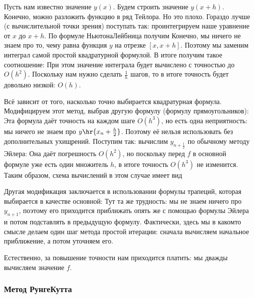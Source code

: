 \documentclass[a4paper]{article}
\newcommand{\dt}{\,dt}
\begin{document}
Пусть нам известно значение $y(x)$. Будем строить значение $y(x+h)$.
Конечно, можно разложить функцию в ряд Тейлора. Но это плохо. Гораздо
лучше (с вычислительной точки зрения) поступать так: проинтегрируем наше уравнение от $x$ до $x+h$.
По формуле Ньютона\ч Лейбница получим
\eqn{y(x+h) = y(x) +\intl{0}{h} f\br{x+t, y(x+t)}\dt.}
Конечно, мы ничего не знаем про то, чему равна функция $y$ на отрезке $[x,x+h]$.
Поэтому мы заменим интеграл самой простой квадратурной формулой.
В итоге получим такое соотношение:
При этом значение интеграла будет вычислено с точностью до $O(h^2)$.
Поскольку нам нужно сделать $\frac{1}{h}$ шагов, то в итоге точность будет довольно низкой: $O(h)$.

Всё зависит от того, насколько точно выбирается квадратурная формула.
Модифицируем этот метод, выбрав другую формулу (формулу прямоугольников):
Эта формула даёт точность на каждом шаге $O(h^3)$, но есть одна неприятность:
мы ничего не знаем про $y\hr{x_n + \frac h2}$. Поэтому её нельзя использовать без дополнительных
ухищрений. Поступим так: вычислим $y_{n+\frac12}$ по обычному методу Эйлера:
Она даёт погрешность $O(h^2)$, но поскольку перед $f$  в основной формуле уже есть один множитель $h$,
в итоге точность $O(h^3)$ не изменится.
Таким образом, схема вычислений в этом случае имеет вид

Другая модификация заключается в использовании формулы трапеций,
которая выбирается в качестве основной:
Тут та же трудность: мы не знаем ничего про $y_{n+1}$, поэтому его приходится
приближать опять же с помощью формулы Эйлера
и потом подставлять в предыдущую формулу. Фактически, здесь мы в каком\д то смысле
делаем один шаг метода простой итерации: сначала вычисляем начальное приближение, а потом уточняем его.

Естественно, за повышение точности нам приходится платить: мы дважды
вычисляем значение $f$.


\subsubsection{Метод Рунге\ч Кутта}
\end{document}
